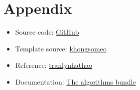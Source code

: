 \section{Appendix}
\begin{itemize}
    \item Source code: \href{https://github.com/pnmq1103/cs163-seminar}{GitHub}
    \item Template source: \href{https://github.com/khongsomeo/hcmus-unofficial-report-template}{khongsomeo} 
    \item Reference: \href{https://github.com/tranlynhathao/fit-vnuhcmus_template}{tranlynhathao}
    \item Documentation: \href{https://mirror.unpad.ac.id/ctan/macros/latex/contrib/algorithms/algorithms.pdf}{The algorithms bundle}
\end{itemize}